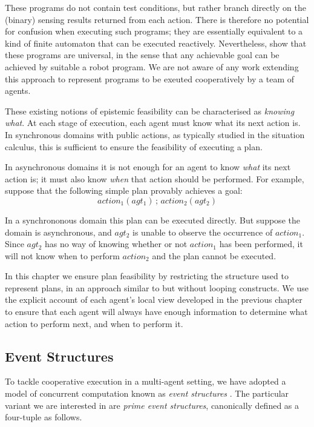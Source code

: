 These programs do not contain test conditions, but rather branch directly
on the (binary) sensing results returned from each action. There is
therefore no potential for confusion when executing such programs;
they are essentially equivalent to a kind of finite automaton that
can be executed reactively. Nevertheless, \citet{levesque98what_robots_can_do}
show that these programs are universal, in the sense that any achievable
goal can be achieved by suitable a robot program. We are not aware
of any work extending this approach to represent programs to be exeuted
cooperatively by a team of agents.

These existing notions of epistemic feasibility can be characterised
as \emph{knowing what}. At each stage of execution, each agent must
know what its next action is. In synchronous domains with public actions,
as typically studied in the situation calculus, this is sufficient
to ensure the feasibility of executing a plan.

In asynchronous domains it is not enough for an agent to know \emph{what}
its next action is; it must also know \emph{when} that action should
be performed. For example, suppose that the following simple plan
provably achieves a goal:\[
action_{1}(agt_{1})\,;\, action_{2}(agt_{2})\]


In a synchrononous domain this plan can be executed directly. But
suppose the domain is asynchronous, and $agt_{2}$ is unable to observe
the occurrence of $action_{1}$. Since $agt_{2}$ has no way of knowing
whether or not $action_{1}$ has been performed, it will not know
when to perform $action_{2}$ and the plan cannot be executed.

In this chapter we ensure plan feasibility by restricting the structure
used to represent plans, in an approach similar to \citep{levesque98what_robots_can_do}
but without looping constructs. We use the explicit account of each
agent's local view developed in the previous chapter to ensure that
each agent will always have enough information to determine what action
to perform next, and when to perform it.


\subsection{Event Structures}

To tackle cooperative execution in a multi-agent setting, we have
adopted a model of concurrent computation known as \emph{event structures}
\citep{npw79event_structures}. The particular variant we are interested
in are \emph{prime event structures}, canonically defined as a four-tuple
as follows.

